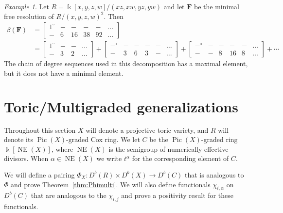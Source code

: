 \documentclass[12pt]{amsart}
\theoremstyle{definition}
\theoremstyle{remark}
\newtheorem{example}[lemma]{Example}
\newcommand{\Pic}{\operatorname{Pic}}
\newcommand{\Cox}{\operatorname{Cox}}
\newcommand{\NE}{\operatorname{NE}}
\newcommand{\irr}{\operatorname{irr}}
\newcommand{\kk}{\Bbbk}
\newcommand{\FF}{\mathbf{F}}
\newcommand{\zp}{\circ}
\begin{document}
\begin{example}
Let $R=\kk[x,y,z,w]/(xz,xw,yz,yw)$ and let $\FF$ be the minimal free resolution of $R/(x,y,z,w)^2$.  Then
\begin{align*}
\beta(\FF)&=\begin{bmatrix}1^\zp&-&-&-&-&\dots \\ -&6&16&38&92&\dots \end{bmatrix}\\
&=\begin{bmatrix}1^\zp&-&-&\dots \\ -&3&2&\dots \end{bmatrix}
+
\begin{bmatrix}-^\zp&-&-&-&-&\dots \\ -&3&6&3&-&\dots \end{bmatrix}
+
\begin{bmatrix}-^\zp&-&-&-&-&\dots \\ -&-&8&16&8&\dots \end{bmatrix}
+
\cdots
\end{align*}
The chain of degree sequences used in this decomposition has a maximal element, but it does not have a minimal element.
\end{example}


\section{Toric/Multigraded generalizations}\label{sec:toric}
Throughout this section $X$ will denote a projective toric variety, and $R$ will denote its
 $\Pic(X)$-graded Cox ring. We let $C$ be the $\Pic(X)$-graded ring $\kk[\NE(X)]$,
 where $\NE(X)$ is the semigroup of numerically effective divisors. 
 When $\alpha\in \NE(X)$ we write $t^{\alpha}$ for the corresponding element of $C$.

We will define a pairing $\Phi_{X}: D^{b}(R) \times D^{b}(X) \to D^{b}(C)$ that is analogous to
$\Phi$ and prove Theorem~\ref{thm:Phimulti}.  We will also define functionals $\chi_{i,\alpha}$ on $D^{b}(C)$ that are analogous to the 
$\chi_{i,j}$ and prove a positivity result for these functionals.


\end{document}
